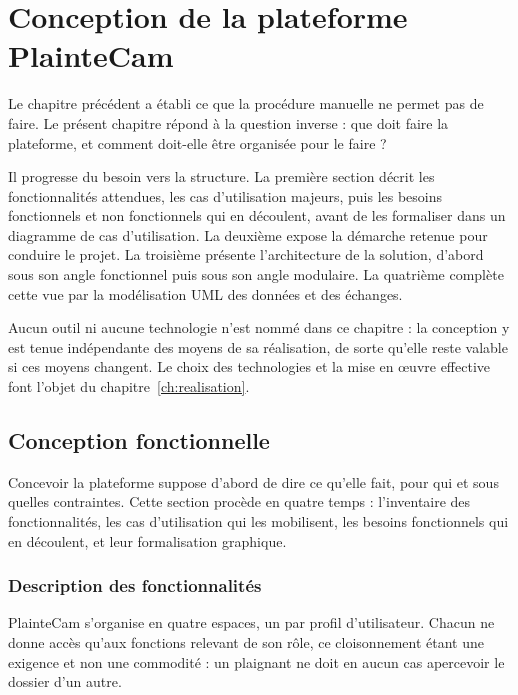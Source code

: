 
\chapter{Conception de la plateforme PlainteCam}
\label{ch:conception}

Le chapitre précédent a établi ce que la procédure manuelle ne permet pas de faire. Le présent chapitre répond à la question inverse : que doit faire la plateforme, et comment doit-elle être organisée pour le faire ?

Il progresse du besoin vers la structure. La première section décrit les fonctionnalités attendues, les cas d'utilisation majeurs, puis les besoins fonctionnels et non fonctionnels qui en découlent, avant de les formaliser dans un diagramme de cas d'utilisation. La deuxième expose la démarche retenue pour conduire le projet. La troisième présente l'architecture de la solution, d'abord sous son angle fonctionnel puis sous son angle modulaire. La quatrième complète cette vue par la modélisation UML des données et des échanges.

Aucun outil ni aucune technologie n'est nommé dans ce chapitre : la conception y est tenue indépendante des moyens de sa réalisation, de sorte qu'elle reste valable si ces moyens changent. Le choix des technologies et la mise en œuvre effective font l'objet du chapitre~\ref{ch:realisation}.

\section{Conception fonctionnelle}

Concevoir la plateforme suppose d'abord de dire ce qu'elle fait, pour qui et sous quelles contraintes. Cette section procède en quatre temps : l'inventaire des fonctionnalités, les cas d'utilisation qui les mobilisent, les besoins fonctionnels qui en découlent, et leur formalisation graphique.

\subsection{Description des fonctionnalités}

PlainteCam s'organise en quatre espaces, un par profil d'utilisateur. Chacun ne donne accès qu'aux fonctions relevant de son rôle, ce cloisonnement étant une exigence et non une commodité : un plaignant ne doit en aucun cas apercevoir le dossier d'un autre.

